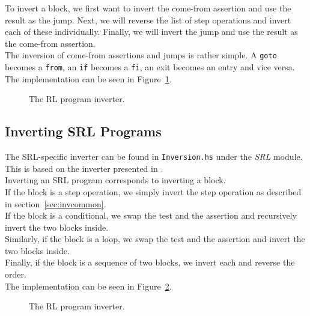 \noindent To invert a block, we first want to invert the come-from assertion and use the result as the jump. Next, we will reverse the list of step operations and invert each of these individually. Finally, we will invert the jump and use the result as the come-from assertion.\\

\noindent The inversion of come-from assertions and jumps is rather simple. A \texttt{goto} becomes a \texttt{from}, an \texttt{if} becomes a \texttt{fi}, an exit becomes an entry and vice versa.\\

\noindent The implementation can be seen in Figure~\ref{fig:rlinvert}.


\begin{figure}[H]
  
  \caption{The RL program inverter.}\label{fig:rlinvert}
\end{figure}

\subsection{Inverting SRL Programs}

The SRL-specific inverter can be found in \texttt{Inversion.hs} under the \textit{SRL} module. This is based on the inverter presented in \cite[Fig.~18]{REV}.\\

\noindent Inverting an SRL program corresponds to inverting a block.\\

\noindent If the block is a step operation, we simply invert the step operation as described in section~\ref{sec:invcommon}.\\

\noindent If the block is a conditional, we swap the test and the assertion and recursively invert the two blocks inside.\\

\noindent Similarly, if the block is a loop, we swap the test and the assertion and invert the two blocks inside.\\

\noindent Finally, if the block is a sequence of two blocks, we invert each and reverse the order.\\

\noindent The implementation can be seen in Figure~\ref{fig:srlinvert}.

\begin{figure}[H]
  
  \caption{The RL program inverter.}\label{fig:srlinvert}
\end{figure}
